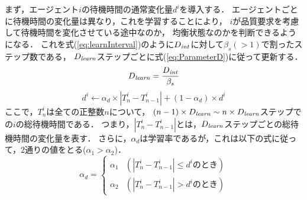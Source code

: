 \documentclass[12pt,a4j,twoside]{jarticle}
\def\DeactCheckInterval{D_{\it int}}
\def\DeactLearnInterval{D_{\it learn}}
\begin{document}
  まず，エージェント$i$の待機時間の通常変化量$d^i$を導入する．
  エージェントごとに待機時間の変化量は異なり，これを学習することにより，
  $i$が品質要求を考慮して待機時間を変化させている途中なのか，
  均衡状態なのかを判断できるようになる．
  これを式(\ref{eq:learnInterval})のように$\DeactCheckInterval$に対して$\beta_s(> 1)$で割ったステップ数である，
  $\DeactLearnInterval$ステップごとに式(\ref{eq:ParameterD})に従って更新する．
  \begin{equation}\label{eq:learnInterval}
    \DeactLearnInterval = \dfrac{\DeactCheckInterval}{\beta_s}
  \end{equation}
  \begin{equation}\label{eq:ParameterD}
    d^i \gets \alpha_d \times |T^i_n - T^i_{n-1}| + (1-\alpha_d) \times d^i
  \end{equation}
  ここで，$T^i_n$は全ての正整数$n$について，
  $(n-1) \times \DeactLearnInterval \sim n \times \DeactLearnInterval$ステップでの$i$の総待機時間である．
  つまり，$|T^i_n - T^i_{n-1}|$とは，$\DeactLearnInterval$ステップごとの総待機時間の変化量を表す．
  さらに，$\alpha_d$は学習率であるが，これは以下の式に従って，2通りの値をとる($\alpha_1 > \alpha_2$)．
    \begin{equation}
      \alpha_d = 
      \begin{cases}
        \alpha_1 & (|T^i_n - T^i_{n-1}| \leq d^i \textrm{のとき}) \\
        \alpha_2 & (|T^i_n - T^i_{n-1}| > d^i \textrm{のとき})
      \end{cases}
    \end{equation}
  \par
\end{document}
